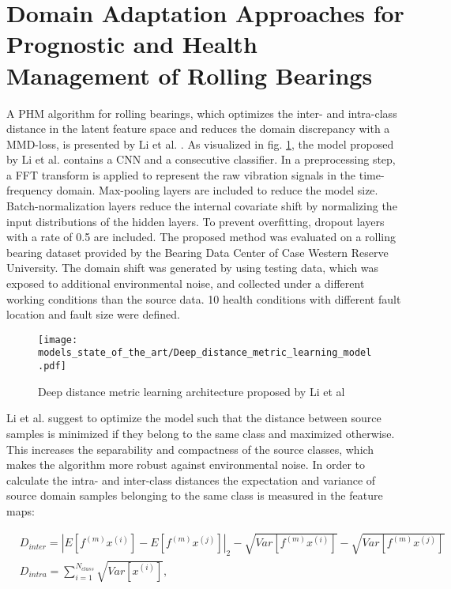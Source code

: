 \section{Domain Adaptation Approaches for Prognostic and Health Management of Rolling Bearings}


A PHM algorithm for rolling bearings, which optimizes the inter- and intra-class distance in the latent feature space and reduces the domain discrepancy with a MMD-loss, is presented by Li et al. \cite{Li2018}. As visualized in fig. \ref{fig:Deep_distance_metric_learning_model}, the model proposed by Li et al. contains a CNN and a consecutive classifier. In a preprocessing step, a FFT transform is applied to represent the raw vibration signals in the time-frequency domain. Max-pooling layers are included to reduce the model size. Batch-normalization layers reduce the internal covariate shift by normalizing the input distributions of the hidden layers. To prevent overfitting, dropout layers with a rate of 0.5 are included. The proposed method was evaluated on a rolling bearing dataset provided by the Bearing Data Center of Case Western Reserve University. The domain shift was generated by using testing data, which was exposed to additional environmental noise, and collected under a different working conditions than the source data. 10 health conditions with different fault location and fault size were defined. 

\begin{figure}[H]
  \centering
  \texttt{[image: models\_state\_of\_the\_art/Deep\_distance\_metric\_learning\_model.pdf]}
  \caption{Deep distance metric learning architecture proposed by Li et al \cite{Li2018}}
  \label{fig:Deep_distance_metric_learning_model}
\end{figure}

Li et al. suggest to optimize the model such that the distance between source samples is minimized if they belong to the same class and maximized otherwise. This increases the separability and compactness of the source classes, which makes the algorithm more robust against environmental noise. In order to calculate the intra- and inter-class distances the expectation and variance of source domain samples belonging to the same class is measured in the feature maps:

\begin{equation}
    \begin{aligned}
       &D_{inter} = |E[f^{(m)}x^{(i)}]-E[f^{(m)}x^{(j)}]|_{2}-\sqrt{Var[f^{(m)}x^{(i)}]}-\sqrt{Var[f^{(m)}x^{(j)}]}\\
       &D_{intra} = 
        \sum_{i=1}^{N_{class}} \sqrt{Var[x^{(i)}]},
    \end{aligned}
\end{equation}

